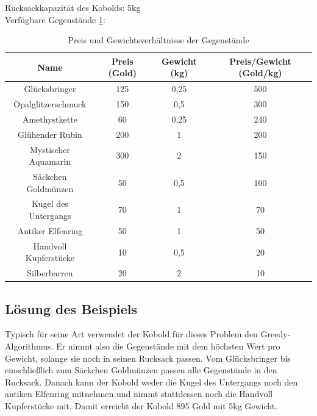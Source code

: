 \documentclass[12pt]{report}
\begin{document}
		Rucksackkapazität des Kobolds: 5kg \\
		Verfügbare Gegenstände \ref{tab:Preis und Gewichtsverhältnisse der Gegenstände}:      
		\begin{table}[H]
			\begin{center}
				\begin{adjustbox}{width=\columnwidth,center}
					\begin{tabular}{|c|c|c|c|}
						\hline
						Name & Preis (Gold) & Gewicht (kg) & Preis/Gewicht (Gold/kg)
						\\
						\hline
						Glücksbringer & 125 & 0,25 & 500
						\\
						\hline
						Opalglitzerschmuck & 150 & 0,5 & 300
						\\
						\hline
						Amethystkette & 60 & 0,25 & 240
						\\
						\hline
						Glühender Rubin & 200 & 1 & 200
						\\
						\hline
						Mystischer Aquamarin & 300 & 2 & 150
						\\
						\hline
						Säckchen Goldmünzen & 50 & 0,5 & 100
						\\
						\hline
						Kugel des Untergangs & 70 & 1 & 70
						\\
						\hline
						Antiker Elfenring & 50 & 1 & 50
						\\
						\hline
						Handvoll Kupferstücke & 10 & 0,5 & 20
						\\
						\hline
						Silberbarren & 20 & 2 & 10
						\\
						\hline
					\end{tabular} 
				\end{adjustbox}
			\end{center} 
			\caption{Preis und Gewichtsverhältnisse der Gegenstände}
			\label{tab:Preis und Gewichtsverhältnisse der Gegenstände}
		\end{table}
		
		\subsection{Lösung des Beispiels}
		Typisch für seine Art verwendet der Kobold für dieses Problem den Greedy-Algorithmus. Er nimmt also die Gegenstände mit dem höchsten Wert pro Gewicht, solange sie noch in seinen Rucksack passen. 
		Vom Glücksbringer bis einschließlich zum Säckchen Goldmünzen passen alle Gegenstände in den Rucksack. Danach kann der Kobold weder die Kugel des Untergangs noch den antiken Elfenring mitnehmen und nimmt stattdessen noch die Handvoll Kupferstücke mit. Damit erreicht der Kobold 895 Gold mit 5kg Gewicht. 
	
\end{document}
